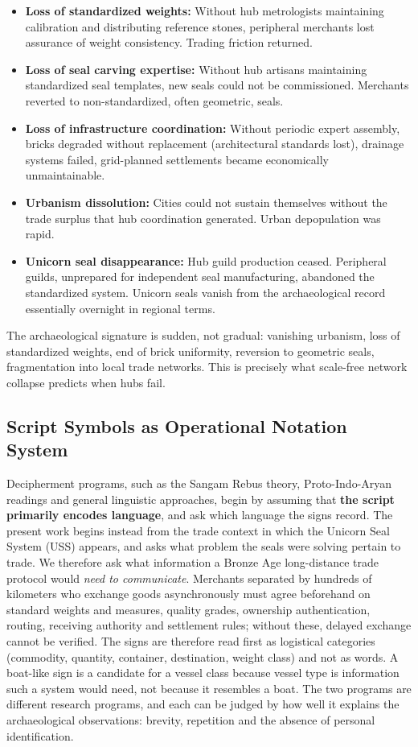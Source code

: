 \documentclass[12pt]{article}
\begin{document}
\begin{itemize}
\item \textbf{Loss of standardized weights:} Without hub metrologists maintaining
calibration and distributing reference stones, peripheral merchants lost assurance
of weight consistency. Trading friction returned.
\item \textbf{Loss of seal carving expertise:} Without hub artisans maintaining
standardized seal templates, new seals could not be commissioned. Merchants
reverted to non-standardized, often geometric, seals.
\item \textbf{Loss of infrastructure coordination:} Without periodic expert
assembly, bricks degraded without replacement (architectural standards lost),
drainage systems failed, grid-planned settlements became economically
unmaintainable.
\item \textbf{Urbanism dissolution:} Cities could not sustain themselves without
the trade surplus that hub coordination generated. Urban depopulation was rapid.
\item \textbf{Unicorn seal disappearance:} Hub guild production ceased. Peripheral
guilds, unprepared for independent seal manufacturing, abandoned the standardized
system.  Unicorn seals vanish from the archaeological record essentially overnight
in regional terms.
\end{itemize}

The archaeological signature is sudden, not gradual: vanishing urbanism, loss of
standardized weights, end of brick uniformity, reversion to geometric seals,
fragmentation into local trade networks. This is precisely what scale-free
network collapse predicts when hubs fail.

\subsection{Script Symbols as Operational Notation System}

Decipherment programs, such as the Sangam Rebus theory, Proto-Indo-Aryan readings
and general linguistic approaches, begin by assuming that \textbf{the script
primarily encodes language}, and ask which language the signs record. The present
work begins instead from the trade context in which the Unicorn Seal System (USS)
appears, and asks what problem the seals were solving pertain to trade. We therefore
ask what information a Bronze Age long-distance trade protocol would \textit{need to
communicate}. Merchants separated by hundreds of kilometers who exchange goods
asynchronously must agree beforehand on standard weights and measures, quality
grades, ownership authentication, routing, receiving authority and settlement
rules; without these, delayed exchange cannot be verified. The signs are
therefore read first as logistical categories (commodity, quantity, container,
destination, weight class) and not as words. A boat-like sign is a candidate
for a vessel class because vessel type is information such a system would need,
not because it resembles a boat. The two programs are different research
programs, and each can be judged by how well it explains the archaeological
observations: brevity, repetition and the absence of personal identification.
\end{document}

